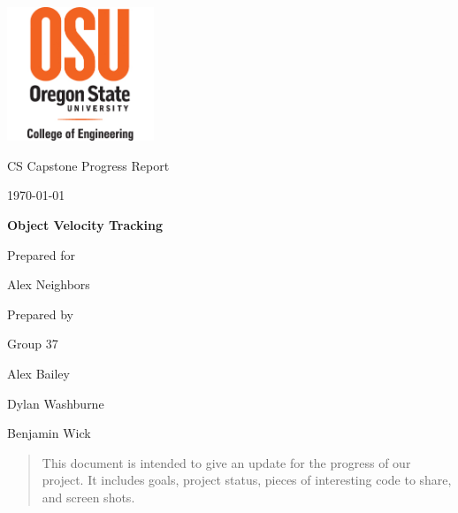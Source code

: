 \documentclass[onecolumn, draftclsnofoot,10pt, compsoc]{IEEEtran}
\def \CapstoneTeamName{			Velocity-Raptors}
\def \CapstoneTeamNumber{		37}
\def \GroupMemberOne{			Alex Bailey}
\def \GroupMemberTwo{			Dylan Washburne}
\def \GroupMemberThree{			Benjamin Wick}
\def \CapstoneProjectName{		Object Velocity Tracking}
\def \CapstoneSponsorCompany{}
\def \CapstoneSponsorPerson{		Alex Neighbors}
\def \DocType{		%
				Progress Report
				}
\newcommand{\NameSigPair}[1]{\par
\makebox[2.75in][r]{#1} \hfil 	\makebox[3.25in]{\makebox[2.25in]{\hrulefill} \hfill		\makebox[.75in]{\hrulefill}}
\par\vspace{-12pt} \textit{\tiny\noindent
\makebox[2.75in]{} \hfil		\makebox[3.25in]{\makebox[2.25in][r]{Signature} \hfill	\makebox[.75in][r]{Date}}}}
\renewcommand{\NameSigPair}[1]{#1}
\begin{document}
\begin{titlepage}
    \begin{singlespace}
    	\includegraphics[height=4cm]{coe_v_spot1}
        \hfill 
        \par\vspace{.2in}
        \centering
        \scshape{
            \huge CS Capstone \DocType \par
            {\large\today}\par
            \vspace{.5in}
            \textbf{\Huge\CapstoneProjectName}\par
            \vfill
            {\large Prepared for}\par
            \Huge \CapstoneSponsorCompany\par
            \vspace{5pt}
            {\Large\NameSigPair{\CapstoneSponsorPerson}\par}
            {\large Prepared by }\par
            Group\CapstoneTeamNumber\par
            \vspace{5pt}
            {\Large
                \NameSigPair{\GroupMemberOne}\par
                \NameSigPair{\GroupMemberTwo}\par
                \NameSigPair{\GroupMemberThree}\par
            }
            \vspace{20pt}
        }
        \begin{abstract}
        	This document is intended to give an update for the progress of our project.
            It includes goals, project status, pieces of interesting code to share, and screen shots.
            
        \end{abstract}     
    \end{singlespace}
\end{titlepage}
\newpage
{}
\tableofcontents
\clearpage
\end{document}
